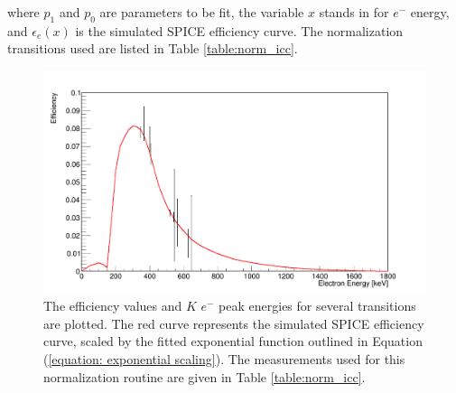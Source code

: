 where $p_1$ and $p_0$ are parameters to be fit, the variable $x$ stands in for $e^-$ energy, and $\epsilon_e(x)$ is the simulated SPICE efficiency curve. The normalization transitions used are listed in Table \ref{table:norm_icc}.

\begin{figure}[!ht]
  \centering 
  \includegraphics[width=\textwidth]{techniques_icc_scaled.png}
  \caption[The efficiency values and $K$ $e^-$ peak energies for several transitions are plotted and fit by an exponential scaling of the simulated SPICE efficiency curve.]{The efficiency values and $K$ $e^-$ peak energies for several transitions are plotted. The red curve represents the simulated SPICE efficiency curve, scaled by the fitted exponential function outlined in Equation (\ref{equation: exponential scaling}). The measurements used for this normalization routine are given in Table \ref{table:norm_icc}.}
  \label{figure: SPICE efficiency normalization with ICC measurements}
\end{figure}


